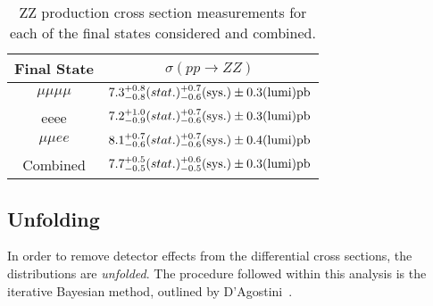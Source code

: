 \begin{table}[h]
\centering
\begin{tabular}{|c|c|}
\hline
Final State & $ \sigma(pp \rightarrow ZZ) $ \\
\hline
$\mu\mu\mu\mu$ & 
$    7.3^{+0.8}_{-0.8} \textrm(stat.) ^{+0.7}_{-0.6}
\textrm{(sys.)}  \pm 0.3 \textrm{(lumi)} \textrm{pb} $\\
 eeee & 
    $7.2^{+1.0}_{-0.9} \textrm(stat.) ^{+0.7}_{-0.6}
\textrm{(sys.)}  \pm 0.3 \textrm{(lumi)} \textrm{pb} $\\

$ \mu \mu ee$ & 
    $8.1^{+0.7}_{-0.6} \textrm(stat.) ^{+0.7}_{-0.6}
\textrm{(sys.)}  \pm 0.4 \textrm{(lumi)} \textrm{pb} $\\
Combined & 
    $7.7^{+0.5}_{-0.5} \textrm(stat.) ^{+0.6}_{-0.5}
\textrm{(sys.)}  \pm 0.3 \textrm{(lumi)} \textrm{pb} $\\
\hline
\end{tabular}
\caption[ZZ production cross section measurements for each of the final states
considered and combined.]{ZZ production cross section measurements for each of the final states
considered and combined.}
\label{tab:cross_sections}
\end{table}

\subsection{Unfolding}
In order to remove detector effects from the differential cross sections, the
distributions are \emph{unfolded}. The procedure followed within this analysis
is the iterative Bayesian method, outlined by D'Agostini~\cite{unfolding}.

